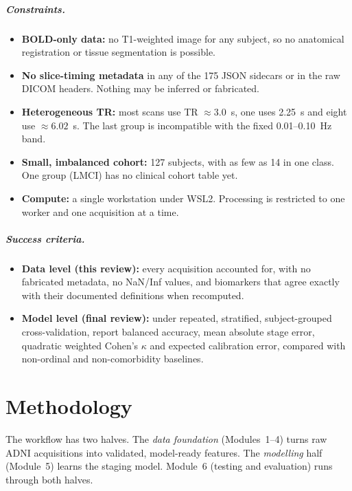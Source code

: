 \documentclass{ssnreview}
\begin{document}
\paragraph{Constraints.}
\begin{itemize}
  \item \textbf{BOLD-only data:} no T1-weighted image for any subject, so no
        anatomical registration or tissue segmentation is possible.
  \item \textbf{No slice-timing metadata} in any of the 175 JSON sidecars or
        in the raw DICOM headers. Nothing may be inferred or fabricated.
  \item \textbf{Heterogeneous TR:} most scans use TR $\approx 3.0$~s, one uses
        2.25~s and eight use $\approx 6.02$~s. The last group is incompatible
        with the fixed 0.01--0.10~Hz band.
  \item \textbf{Small, imbalanced cohort:} 127 subjects, with as few as 14 in
        one class. One group (LMCI) has no clinical cohort table yet.
  \item \textbf{Compute:} a single workstation under WSL2. Processing is
        restricted to one worker and one acquisition at a time.
\end{itemize}

\paragraph{Success criteria.}
\begin{itemize}
  \item \textbf{Data level (this review):} every acquisition accounted for,
        with no fabricated metadata, no NaN/Inf values, and biomarkers that
        agree exactly with their documented definitions when recomputed.
  \item \textbf{Model level (final review):} under repeated, stratified,
        subject-grouped cross-validation, report balanced accuracy, mean
        absolute stage error, quadratic weighted Cohen's $\kappa$ and expected
        calibration error, compared with non-ordinal and non-comorbidity
        baselines.
\end{itemize}

\chapter{Methodology}\label{ch:methodology}

The workflow has two halves. The \emph{data foundation} (Modules~1--4) turns
raw ADNI acquisitions into validated, model-ready features. The
\emph{modelling} half (Module~5) learns the staging model. Module~6
(testing and evaluation) runs through both halves.
\end{document}
